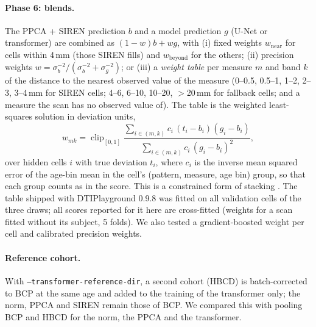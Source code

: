\documentclass[11pt]{article}
\begin{document}
\paragraph{Phase 6: blends.} The PPCA + SIREN prediction $b$ and a model prediction $g$ (U-Net or transformer) are
combined as $(1-w)b+wg$, with (i) fixed weights $w_{\text{near}}$ for cells within 4\,mm (those SIREN fills) and
$w_{\text{beyond}}$ for the others; (ii) precision weights $w=\sigma_b^{-2}/(\sigma_b^{-2}+\sigma_g^{-2})$; or (iii) a
\emph{weight table} per measure $m$ and band $k$ of the distance to the nearest observed value of the measure (0--0.5,
0.5--1, 1--2, 2--3, 3--4\,mm for SIREN cells; 4--6, 6--10, 10--20, $>$20\,mm for fallback cells; and a measure the scan
has no observed value of). The table is the weighted least-squares solution in deviation units,
\begin{equation}
w_{mk}=\operatorname{clip}_{[0,1]}\frac{\sum_{i\in(m,k)}c_i\,(t_i-b_i)(g_i-b_i)}{\sum_{i\in(m,k)}c_i\,(g_i-b_i)^2},
\end{equation}
over hidden cells $i$ with true deviation $t_i$, where $c_i$ is the inverse mean squared error of the age-bin mean
in the cell's (pattern, measure, age bin) group, so that each group counts as in the score. This is a constrained form
of stacking \citep{wolpert1992stacked,breiman1996stacked}. The table shipped with DTIPlayground 0.9.8 was fitted on
all validation cells of the three draws; all scores reported for it here are cross-fitted (weights for a scan fitted
without its subject, 5 folds). We also tested a gradient-boosted weight per cell and calibrated precision weights.

\paragraph{Reference cohort.} With \texttt{--transformer-reference-dir}, a second cohort (HBCD) is batch-corrected to
BCP at the same age and added to the training of the transformer only; the norm, PPCA and SIREN remain those of BCP.
We compared this with pooling BCP and HBCD for the norm, the PPCA and the transformer.
\end{document}
